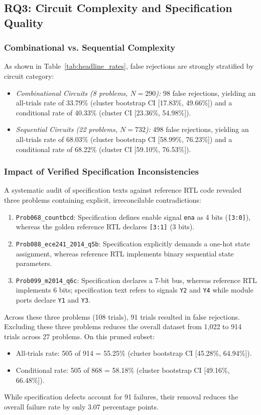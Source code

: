 \documentclass[conference]{IEEEtran}
\begin{document}
\subsection{RQ3: Circuit Complexity and Specification Quality}
\subsubsection{Combinational vs. Sequential Complexity}
As shown in Table~\ref{tab:headline_rates}, false rejections are strongly stratified by circuit category:
\begin{itemize}
    \item \textit{Combinational Circuits (8 problems, $N=290$):} 98 false rejections, yielding an all-trials rate of 33.79\% (cluster bootstrap CI [17.83\%, 49.66\%]) and a conditional rate of 40.33\% (cluster CI [23.36\%, 54.98\%]).
    \item \textit{Sequential Circuits (22 problems, $N=732$):} 498 false rejections, yielding an all-trials rate of 68.03\% (cluster bootstrap CI [58.99\%, 76.23\%]) and a conditional rate of 68.22\% (cluster CI [59.10\%, 76.53\%]).
\end{itemize}

\subsubsection{Impact of Verified Specification Inconsistencies}
A systematic audit of specification texts against reference RTL code revealed three problems containing explicit, irreconcilable contradictions:
\begin{enumerate}
    \item \texttt{Prob068\_countbcd}: Specification defines enable signal \texttt{ena} as 4 bits (\texttt{[3:0]}), whereas the golden reference RTL declares \texttt{[3:1]} (3 bits).
    \item \texttt{Prob088\_ece241\_2014\_q5b}: Specification explicitly demands a one-hot state assignment, whereas reference RTL implements binary sequential state parameters.
    \item \texttt{Prob099\_m2014\_q6c}: Specification declares a 7-bit bus, whereas reference RTL implements 6 bits; specification text refers to signals \texttt{Y2} and \texttt{Y4} while module ports declare \texttt{Y1} and \texttt{Y3}.
\end{enumerate}
Across these three problems (108 trials), 91 trials resulted in false rejections. Excluding these three problems reduces the overall dataset from 1,022 to 914 trials across 27 problems. On this pruned subset:
\begin{itemize}
    \item All-trials rate: 505 of 914 = 55.25\% (cluster bootstrap CI [45.28\%, 64.94\%]).
    \item Conditional rate: 505 of 868 = 58.18\% (cluster bootstrap CI [49.16\%, 66.48\%]).
\end{itemize}
While specification defects account for 91 failures, their removal reduces the overall failure rate by only 3.07 percentage points.
\end{document}
